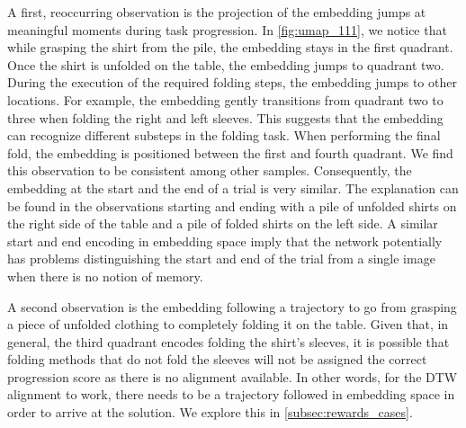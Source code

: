 \documentclass[\home/main.tex]{subfiles}
\begin{document}
A first, reoccurring observation is the projection of the embedding jumps at meaningful moments during task progression. In \cref{fig:umap_111}, we notice that while grasping the shirt from the pile, the embedding stays in the first quadrant. Once the shirt is unfolded on the table, the embedding jumps to quadrant two. During the execution of the required folding steps, the embedding jumps to other locations. For example, the embedding gently transitions from quadrant two to three when folding the right and left sleeves. This suggests that the embedding can recognize different substeps in the folding task. When performing the final fold, the embedding is positioned between the first and fourth quadrant. We find this observation to be consistent among other samples. Consequently, the embedding at the start and the end of a trial is very similar. The explanation can be found in the observations starting and ending with a pile of unfolded shirts on the right side of the table and a pile of folded shirts on the left side. A similar start and end encoding in embedding space imply that the network potentially has problems distinguishing the start and end of the trial from a single image when there is no notion of memory.

A second observation is the embedding following a trajectory to go from grasping a piece of unfolded clothing to completely folding it on the table. Given that, in general, the third quadrant encodes folding the shirt's sleeves, it is possible that folding methods that do not fold the sleeves will not be assigned the correct progression score as there is no alignment available. In other words, for the DTW alignment to work, there needs to be a trajectory followed in embedding space in order to arrive at the solution. We explore this in \cref{subsec:rewards_cases}.
\end{document}
